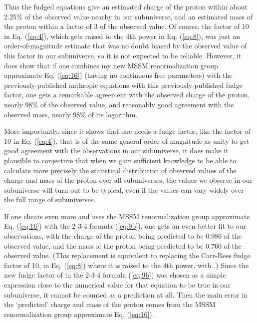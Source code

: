 \documentclass[a4paper,12pt]{article}
\begin{document}
	Thus the fudged equations give an estimated charge
of the proton within about 2.25\% of the observed value
nearby in our subuniverse, and an estimated mass of the proton
within a factor of 3 of the observed value.
Of course, the factor of 10 in Eq. (\ref{eq:4}),
which gets raised to the 4th power in Eq. (\ref{eq:8}),
was just an order-of-magnitude estimate that was no doubt biased
by the observed value of this factor in our subuniverse,
so it is not expected to be reliable.
However, it does show that if one combines my
new MSSM renormalization group approximate Eq. (\ref{eq:16})
(having no continuous free parameters)
with the previously-published anthropic equations with
this previously-published fudge factor,
one gets a remarkable agreement with the observed
charge of the proton, nearly 98\% of the observed value,
and reasonably good agreement with the observed mass,
nearly 98\% of its logarithm.

	More importantly, since it shows that one needs
a fudge factor, like the factor of 10 in Eq. (\ref{eq:4}),
that is of the same general
order of magnitude as unity to get good agreement with
the observations in our subuniverse, it does make it
plausible to conjecture that when we gain sufficient
knowledge to be able to calculate more precisely
the statistical distribution of observed values
of the charge and mass of the proton over all subuniverses,
the values we observe in our subuniverse will turn out
to be typical, even if the values can vary
widely over the full range of subuniverses.

	If one cheats even more and uses the
MSSM renormalization group approximate Eq. (\ref{eq:16})
with the 2-3-4 formula (\ref{eq:9b}),
one gets an even better fit to our observations,
with the charge of the proton being predicted
to be 0.986 of the observed value,
and the mass of the proton being predicted to be
0.760 of the observed value.
(This replacement is equivalent to replacing
the Carr-Rees fudge factor of 10,
in Eq. (\ref{eq:8}) where it is raised to the 4th power,
with \coordHE{}.)
Since the new fudge factor of \coordHE{} in the 2-3-4 formula (\ref{eq:9b})
was chosen as a simple expression close to the numerical
value for that equation to be true in our subuniverse,
it cannot be counted as a prediction at all.
Then the main error in the `predicted' charge and mass of the
proton comes from the
MSSM renormalization group approximate Eq. (\ref{eq:16}).
\end{document}
